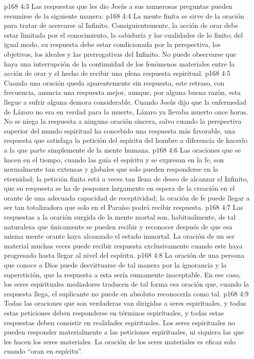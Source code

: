 \vs p168 4:3 Las respuestas que les dio Jesús a sus numerosas preguntas pueden resumirse de la siguiente manera:
\vs p168 4:4 La mente finita se sirve de la oración para tratar de acercarse al Infinito. Consiguientemente, la acción de orar debe estar limitada por el conocimiento, la sabiduría y las cualidades de lo finito; del igual modo, su respuesta debe estar condicionada por la perspectiva, los objetivos, los ideales y las prerrogativas del Infinito. No puede observarse que haya una interrupción de la continuidad de los fenómenos materiales entre la acción de orar y el hecho de recibir una plena respuesta espiritual.
\vs p168 4:5 Cuando una oración queda aparentemente sin respuesta, este retraso, con frecuencia, anuncia una respuesta mejor, aunque, por alguna buena razón, esta llegue a sufrir alguna demora considerable. Cuando Jesús dijo que la enfermedad de Lázaro no era en verdad para la muerte, Lázaro ya llevaba muerto once horas. No se niega la respuesta a ninguna oración sincera, salvo cuando la perspectiva superior del mundo espiritual ha concebido una respuesta más favorable, una respuesta que satisfaga la petición del espíritu del hombre a diferencia de hacerlo a la que parte simplemente de la mente humana.
\vs p168 4:6 Las oraciones que se hacen en el tiempo, cuando las guía el espíritu y se expresan en la fe, son normalmente tan extensas y globales que solo pueden responderse en la eternidad; la petición finita está a veces tan llena de deseo de alcanzar el Infinito, que su respuesta se ha de posponer largamente en espera de la creación en el orante de una adecuada capacidad de receptividad; la oración de fe puede llegar a ser tan totalizadora que solo en el Paraíso podrá recibir respuesta.
\vs p168 4:7 Las respuestas a la oración surgida de la mente mortal son, habitualmente, de tal naturaleza que únicamente se pueden recibir y reconocer después de que esa misma mente orante haya alcanzado el estado inmortal. La oración de un ser material muchas veces puede recibir respuesta exclusivamente cuando este haya progresado hasta llegar al nivel del espíritu.
\vs p168 4:8 La oración de una persona que conoce a Dios puede desvirtuarse de tal manera por la ignorancia y la superstición, que la respuesta a esta sería sumamente inaceptable. En ese caso, los seres espirituales mediadores traducen de tal forma esa oración que, cuando la respuesta llega, el suplicante no puede en absoluto reconocerla como tal.
\vs p168 4:9 Todas las oraciones que son verdaderas van dirigidas a seres espirituales, y todas estas peticiones deben responderse en términos espirituales, y todas estas respuestas deben consistir en realidades espirituales. Los seres espirituales no pueden responder materialmente a las peticiones espirituales, ni siquiera las que les hacen los seres materiales. La oración de los seres materiales es eficaz solo cuando “oran en espíritu”.

